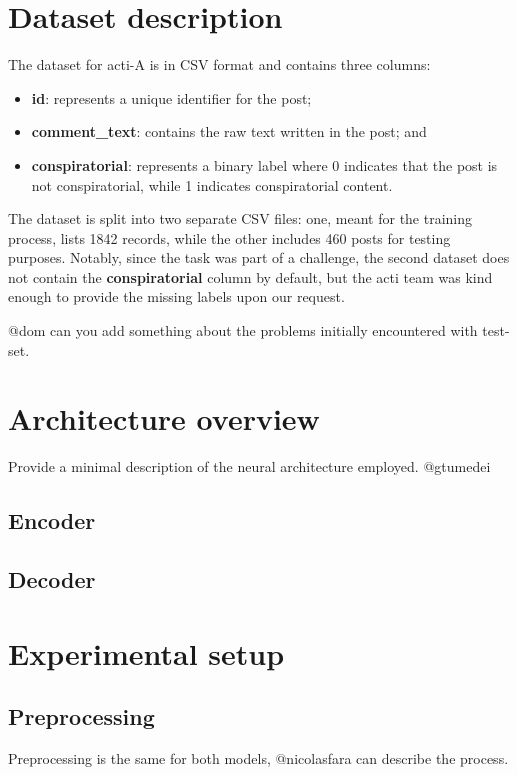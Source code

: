 \documentclass[11pt]{article}
\begin{document}
\section{Dataset description}\label{sec:dataset-description}
The dataset for \ac{acti}-A is in CSV format and contains three columns:
\begin{itemize}
  \item \textbf{id}: represents a unique identifier for the post;
  \item \textbf{comment\_text}: contains the raw text written in the post; and
  \item \textbf{conspiratorial}: represents a binary label where 0 indicates that the post is not conspiratorial,
    while 1 indicates conspiratorial content.
\end{itemize}
The dataset is split into two separate CSV files: one, meant for the training process, lists
1842 records, while the other includes 460 posts for testing purposes.
%
Notably, since the task was part of a challenge, the second dataset does not contain the
\textbf{conspiratorial} column by default, but the \ac{acti} team was kind enough to provide the
missing labels upon our request.

@dom can you add something about the problems initially encountered with test-set.

\section{Architecture overview}\label{sec:architecture-overview}
Provide a minimal description of the neural architecture employed.
@gtumedei

\subsection{Encoder}

\subsection{Decoder}


\section{Experimental setup}\label{sec:experimental-setup}

\subsection{Preprocessing}\label{sec:preprocessing}
Preprocessing is the same for both models, @nicolasfara can describe the process.
\end{document}
